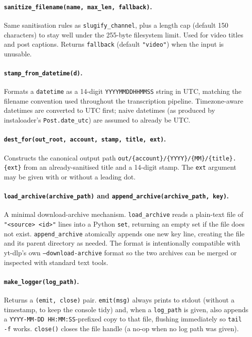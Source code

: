 \documentclass[11pt,a4paper]{report}
\newcommand{\code}[1]{\texttt{\small #1}}
\begin{document}
\paragraph{\texttt{sanitize\_filename(name, max\_len, fallback)}.}
Same sanitisation rules as \texttt{slugify\_channel}, plus a length cap
(default 150 characters) to stay well under the 255-byte filesystem limit.  Used
for video titles and post captions.  Returns \code{fallback} (default
\code{"video"}) when the input is unusable.

\paragraph{\texttt{stamp\_from\_datetime(d)}.}
Formats a \code{datetime} as a 14-digit \code{YYYYMMDDHHMMSS} string in UTC,
matching the filename convention used throughout the transcription pipeline.
Timezone-aware datetimes are converted to UTC first; naive datetimes (as produced
by instaloader's \code{Post.date\_utc}) are assumed to already be UTC.

\paragraph{\texttt{dest\_for(out\_root, account, stamp, title, ext)}.}
Constructs the canonical output path
\code{out/\{account\}/\{YYYY\}/\{MM\}/\{title\}.\{ext\}} from an already-sanitised
title and a 14-digit stamp.  The \code{ext} argument may be given with or without
a leading dot.

\paragraph{\texttt{load\_archive(archive\_path)} and \texttt{append\_archive(archive\_path, key)}.}
A minimal download-archive mechanism.  \texttt{load\_archive} reads a plain-text
file of \code{"<source> <id>"} lines into a Python \code{set}, returning an empty
set if the file does not exist.  \texttt{append\_archive} atomically appends one
new key line, creating the file and its parent directory as needed.  The format is
intentionally compatible with yt-dlp's own \code{--download-archive} format so the
two archives can be merged or inspected with standard text tools.

\paragraph{\texttt{make\_logger(log\_path)}.}
Returns a \code{(emit, close)} pair.  \code{emit(msg)} always prints to stdout
(without a timestamp, to keep the console tidy) and, when a \code{log\_path} is
given, also appends a \code{YYYY-MM-DD HH:MM:SS}-prefixed copy to that file,
flushing immediately so \code{tail -f} works.  \code{close()} closes the file
handle (a no-op when no log path was given).
\end{document}

